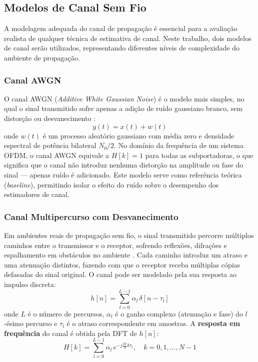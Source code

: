 \documentclass[conference]{IEEEtran}
\begin{document}
\subsection{Modelos de Canal Sem Fio}

A modelagem adequada do canal de propagação é essencial para a avaliação realista de qualquer técnica de estimativa de canal. Neste trabalho, dois modelos de canal serão utilizados, representando diferentes níveis de complexidade do ambiente de propagação.

\subsubsection{Canal AWGN}

O canal AWGN (\textit{Additive White Gaussian Noise}) é o modelo mais simples, no qual o sinal transmitido sofre apenas a adição de ruído gaussiano branco, sem distorção ou desvanecimento \cite{proakis2008}:
\begin{equation}
    y(t) = x(t) + w(t)
    \label{eq:awgn}
\end{equation}
onde $w(t)$ é um processo aleatório gaussiano com média zero e densidade espectral de potência bilateral $N_0/2$. No domínio da frequência de um sistema OFDM, o canal AWGN equivale a $H[k] = 1$ para todas as subportadoras, o que significa que o canal não introduz nenhuma distorção na amplitude ou fase do sinal --- apenas ruído é adicionado. Este modelo serve como referência teórica (\textit{baseline}), permitindo isolar o efeito do ruído sobre o desempenho dos estimadores de canal.

\subsubsection{Canal Multipercurso com Desvanecimento}

Em ambientes reais de propagação sem fio, o sinal transmitido percorre múltiplos caminhos entre o transmissor e o receptor, sofrendo reflexões, difrações e espalhamento em obstáculos no ambiente \cite{goldsmith2005}. Cada caminho introduz um atraso e uma atenuação distintos, fazendo com que o receptor receba múltiplas cópias defasadas do sinal original. O canal pode ser modelado pela sua resposta ao impulso discreta:
\begin{equation}
    h[n] = \sum_{l=0}^{L-1} \alpha_l \, \delta[n - \tau_l]
    \label{eq:multipath}
\end{equation}
onde $L$ é o número de percursos, $\alpha_l$ é o ganho complexo (atenuação e fase) do $l$-ésimo percurso e $\tau_l$ é o atraso correspondente em amostras. A \textbf{resposta em frequência} do canal é obtida pela DFT de $h[n]$:
\begin{equation}
    H[k] = \sum_{l=0}^{L-1} \alpha_l \, e^{-j \frac{2\pi}{N} k \tau_l}, \quad k = 0, 1, \ldots, N-1
    \label{eq:cfr}
\end{equation}
\end{document}
